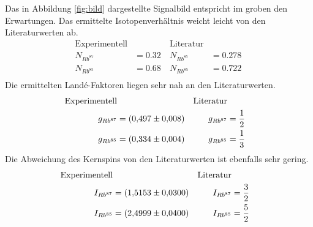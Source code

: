 Das in Abbildung \ref{fig:bild} dargestellte Signalbild entspricht im groben den Erwartungen.
Das ermittelte Isotopenverhältnis weicht leicht von den Literaturwerten \cite{Ver} ab.
\begin{align*}
  \text{Experimentell}&&\text{Literatur}\\
  N_{Rb^{87}}&=\SI{0,32}{}&N_{Rb^{87}}&=\SI{0,278}{}\\
  N_{Rb^{85}}&=\SI{0,68}{}&N_{Rb^{85}}&=\SI{0,722}{}\\
\end{align*}
Die ermittelten Landé-Faktoren liegen sehr nah an den Literaturwerten\cite{Ver}.
\begin{align*}
  \text{Experimentell}&&\text{Literatur}\\
  g_{Rb^{87}} &= \SI{0,497\pm0,008}{}&g_{Rb^{87}} &= \frac{1}{2}\\
  g_{Rb^{85}} &= \SI{0,334\pm0,004}{}&g_{Rb^{85}} &= \frac{1}{3}\\
\end{align*}
Die Abweichung des Kernspins von den Literaturwerten \cite{Spin} ist ebenfalls sehr gering.
\begin{align*}
  \text{Experimentell}&&\text{Literatur}\\
  I_{Rb^{87}}&=\SI{1,5153\pm0,03}{}&I_{Rb^{87}}&=\frac{3}{2}\\
  I_{Rb^{85}}&=\SI{2,4999\pm0,04}{}&I_{Rb^{85}}&=\frac{5}{2}\\
\end{align*}
